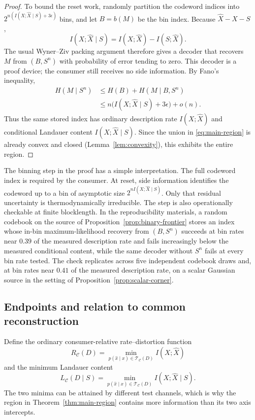\documentclass[letterpaper,onecolumn]{IEEEtran}
\theoremstyle{definition}
\theoremstyle{remark}
\newcommand{\cC}{\mathcal{C}}
\newcommand{\hX}{\widehat{X}}
\newcommand{\1}{\mathbf{1}}
\begin{document}
\begin{proof}
To bound the reset work, randomly partition the codeword indices into
$2^{n(I(X;\hX\mid S)+3\epsilon)}$ bins, and let $B=b(M)$ be the bin index.
Because $\hX-X-S$,
\begin{equation}
 I(X;\hX\mid S)=I(X;\hX)-I(S;\hX).
\end{equation}
The usual Wyner--Ziv packing argument therefore gives a decoder that recovers
$M$ from $(B,S^n)$ with probability of error tending to zero. This decoder is a
proof device; the consumer still receives no side information. By Fano's
inequality,
\begin{align}
 H(M\mid S^n)
 &\le H(B)+H(M\mid B,S^n)\nonumber\\
 &\le n\bigl(I(X;\hX\mid S)+3\epsilon\bigr)+o(n).
 \label{eq:entropy-ach}
\end{align}
Thus the same stored index has ordinary description rate $I(X;\hX)$ and
conditional Landauer content $I(X;\hX\mid S)$. Since the union in
\eqref{eq:main-region} is already convex and closed
(Lemma~\ref{lem:convexity}), this exhibits the entire region.
\end{proof}

The binning step in the proof has a simple interpretation. The full codeword
index is required by the consumer. At reset, side information identifies the
codeword up to a bin of asymptotic size $2^{nI(X;\hX\mid S)}$. Only that
residual uncertainty is thermodynamically irreducible. The step is also
operationally checkable at finite blocklength. In the reproducibility
materials, a random codebook on the source of
Proposition~\ref{prop:binary-frontier} stores an index whose in-bin
maximum-likelihood recovery from $(B,S^n)$ succeeds at bin rates near $0.39$
of the measured description rate and fails increasingly below the measured
conditional content, while the same decoder without $S^n$ fails at every bin
rate tested. The check replicates across five independent codebook draws
and, at bin rates near $0.41$ of the measured description rate, on a scalar
Gaussian source in the setting of
Proposition~\ref{prop:scalar-corner}.

\subsection{Endpoints and relation to common reconstruction}

Define the ordinary consumer-relative rate--distortion function
\begin{equation}
 R_{\cC}(D)
 =\min_{p(\hat x\mid x)\in\mathcal T_{\cC}(D)}I(X;\hX)
 \label{eq:ordinary-rd}
\end{equation}
and the minimum Landauer content
\begin{equation}
 L_{\cC}(D\mid S)
 =\min_{p(\hat x\mid x)\in\mathcal T_{\cC}(D)}I(X;\hX\mid S).
 \label{eq:work-endpoint}
\end{equation}
The two minima can be attained by different test channels, which is why the
region in Theorem~\ref{thm:main-region} contains more information than its two
axis intercepts.
\end{document}
